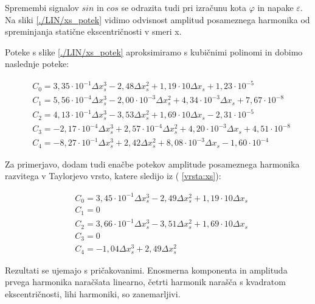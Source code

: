 \newpage
Spremembi signalov $sin$ in $cos$ se odrazita tudi pri izračunu kota $\varphi$ in napake $\varepsilon$.
Na sliki \ref{./LIN/xs_potek} vidimo odvisnost amplitud posameznega harmonika od spreminjanja statične ekscentričnosti v smeri x.


Poteke s slike \ref{./LIN/xs_potek} aproksimiramo s kubičnimi polinomi in dobimo naslednje poteke:


\begin{eqnarray}
&C_0 =3,35\cdot 10^{-1}\Delta x_s^{3}-2,48\Delta x_s^{2}+1,19\cdot 10\Delta x_s+1,23\cdot 10^{-5} \\
&C_1 =5,56\cdot 10^{-4}\Delta x_s^{3}-2,00\cdot 10^{-3}\Delta x_s^{2}+4,34\cdot 10^{-3}\Delta x_s+7,67\cdot 10^{-8} \\
&C_2 =4,13\cdot 10^{-1}\Delta x_s^{3}-3,53\Delta x_s^{2}+1,69\cdot 10\Delta x_s-2,31\cdot 10^{-5} \\
&C_3 =-2,17\cdot 10^{-4}\Delta x_s^{3}+2,57\cdot 10^{-4}\Delta x_s^{2}+4,20\cdot 10^{-3}\Delta x_s+4,51\cdot 10^{-8} \\
&C_4 =-8,27\cdot 10^{-1}\Delta x_s^{3}+2,42\Delta x_s^{2}+8,08\cdot 10^{-3}\Delta x_s-1,60\cdot 10^{-4}
\end{eqnarray}

Za primerjavo, dodam tudi enačbe potekov amplitude posameznega harmonika razvitega v Taylorjevo vrsto, katere sledijo iz ( \ref{vrsta:xs}):

\begin{eqnarray}
&C_0 =3,45\cdot 10^{-1}\Delta x_s^{3}-2,49\Delta x_s^{2}+1,19\cdot 10\Delta x_s \\
&C_1 = 0\\
&C_2 =3,66\cdot 10^{-1}\Delta x_s^{3}-3,51\Delta x_s^{2}+1,69\cdot 10\Delta x_s\\
&C_3 = 0\\
&C_4 =-1,04\Delta x_s^{3}+2,49\Delta x_s^{2}
\end{eqnarray}

Rezultati se ujemajo s pričakovanimi. Enosmerna komponenta in amplituda prvega harmonika naračšata linearno, četrti harmonik narašča s kvadratom ekscentričnosti, lihi harmoniki, so zanemarljivi.



